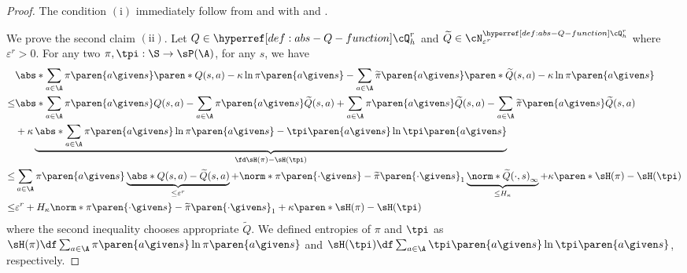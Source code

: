 \begin{proof}
The condition $(\mathrm{i})$ immediately follow from  and  with  and .

We prove the second claim $(\mathrm{ii})$.
Let $Q \in \cQr_h$ and $\widetilde{Q} \in \cN^{\cQr_h}_{\varepsilon^r}$ where $\varepsilon^r > 0$.
For any two $\pi, \tpi : \S \to \sP(\A)$, for any $s$, we have
\begin{align*}
&\abs*{
\sum_{a \in \A}\pi\paren{a \given s} \paren*{Q(s, a) -\kappa \ln \pi\paren{a \given s}}
- \sum_{a \in \A}\widetilde{\pi}\paren{a \given s} \paren*{\widetilde{Q}(s, a) - \kappa \ln \pi \paren{a \given s}}
}\\
\leq &
\abs*{
\sum_{a \in \A}\pi\paren{a \given s} Q(s, a) 
- \sum_{a \in \A}\pi\paren{a \given s} \widetilde{Q}(s, a)    
+ \sum_{a \in \A}\pi\paren{a \given s} \widetilde{Q}(s, a)    
- \sum_{a \in \A}\widetilde{\pi}\paren{a \given s} \widetilde{Q}(s, a)    
}\\
&+ \kappa \underbrace{\abs*{\sum_{a \in \A}\pi\paren{a \given s}\ln \pi\paren{a \given s} - \tpi\paren{a \given s}\ln \tpi\paren{a \given s}}}_{\fd \sH(\pi) - \sH(\tpi)}
\\
\leq &
\sum_{a \in \A}\pi\paren{a \given s} \underbrace{\abs*{Q(s, a) - \widetilde{Q}(s, a)}}_{\leq \varepsilon^r}
+ 
\norm*{\pi\paren{\cdot \given s} - \widetilde{\pi}\paren{\cdot \given s}}_1 \underbrace{\norm*{\widetilde{Q}(\cdot, s)}_\infty}_{\leq H_\kappa} + \kappa \paren*{\sH(\pi) - \sH(\tpi)}
\\
\leq & \varepsilon^r + 
H_\kappa \norm*{\pi\paren{\cdot \given s} - \widetilde{\pi}\paren{\cdot \given s}}_1  
+ \kappa \paren*{\sH(\pi) - \sH(\tpi)}
\end{align*}
where the second inequality chooses appropriate $\widetilde{Q}$.
We defined entropies of $\pi$ and $\tpi$ as $\sH(\pi) \df \sum_{a \in \A}\pi\paren{a \given s}\ln \pi\paren{a \given s}$ and $\sH(\tpi) \df \sum_{a \in \A}\tpi\paren{a \given s}\ln \tpi\paren{a \given s}$, respectively.


\end{proof}

